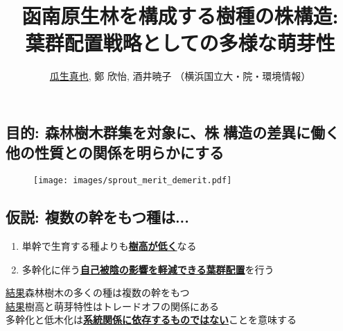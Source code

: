 \documentclass[a0, 30pt, plainboxedsections]{sciposter} %
\title{\textcolor{Blue1}{函南原生林を構成する樹種の株構造:\\\vspace{-0.2em} 葉群配置戦略としての多様な萌芽性}}
\author{\underline{瓜生真也}, 鄭 欣怡, 酒井暁子 （横浜国立大・院・環境情報） \normalsize{\faEnvelope \hspace{0.02em} \fontspec{GillSans-Italic}{suika1127@gmail.com}}}
\begin{document}
\maketitle
\vspace{-2em}
\begin{multicols}{2}
\begin{mdframed}[style=section.frame]
  \centering\LARGE\textbf{\color{white}{はじめに}}
\end{mdframed}

\subsection*{目的: 森林樹木群集を対象に、株構造の差異に働く\\他の性質との関係を明らかにする}

\begin{figure}
  \centering\texttt{[image: images/sprout\_merit\_demerit.pdf]}
\end{figure}

\vspace{-0.8em}
\subsection*{仮説: 複数の幹をもつ種は...}

\begin{enumerate}\setlength{\itemindent}{1em}
\item 単幹で生育する種よりも\underline{\textbf{樹高が低く}}なる
\item 多幹化に伴う\underline{\textbf{自己被陰の影響を軽減できる葉群配置}}を行う
\end{enumerate}

\columnbreak
\begin{mdframed}[style=conclusion.frame,frametitle={\textbf{\color{Black1}{
  \large\textbf{\faFlagAlt \vspace{0.02em} 結論: {萌芽性は最大樹高と相反して発達し、多様な受光体制の存在が樹種の共存に貢献している}}}}}]
  \vspace{0.4em}
  \flushleft
  \normalsize{\underline{結果}森林樹木の多くの種は複数の幹をもつ\\
  \underline{結果}樹高と萌芽特性はトレードオフの関係にある\\
  }
  \large{\faHandLeft \vspace{0.02em} 多幹化と低木化は\textbf{\underline{系統関係に依存するものではない}}ことを意味する} %
  

\end{mdframed}
\end{multicols}
\end{document}
